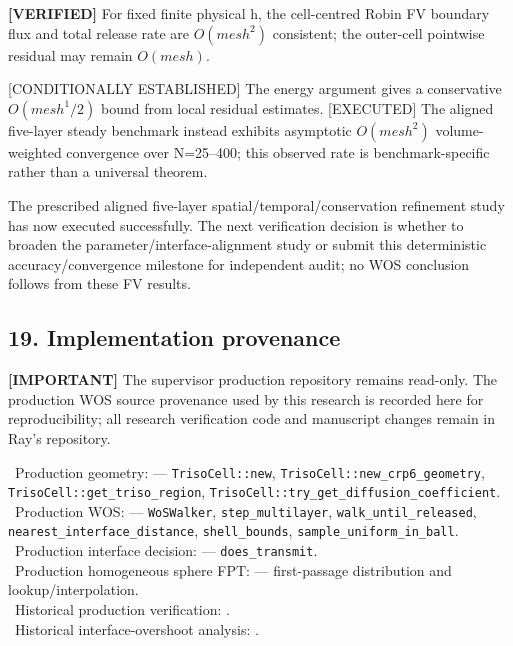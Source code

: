 \documentclass[11pt,a4paper]{article}
\begin{document}
\textbf{[VERIFIED]} For fixed finite physical h, the cell-centred Robin FV boundary flux and total release rate are $O(mesh^2)$ consistent; the outer-cell pointwise residual may remain $O(mesh)$.

[CONDITIONALLY ESTABLISHED] The energy argument gives a conservative $O(mesh^1/2)$ bound from local residual estimates. [EXECUTED] The aligned five-layer steady benchmark instead exhibits asymptotic $O(mesh^2)$ volume-weighted convergence over N=25–400; this observed rate is benchmark-specific rather than a universal theorem.

The prescribed aligned five-layer spatial/temporal/conservation refinement study has now executed successfully. The next verification decision is whether to broaden the parameter/interface-alignment study or submit this deterministic accuracy/convergence milestone for independent audit; no WOS conclusion follows from these FV results.

\subsection*{19. Implementation provenance}

\textbf{[IMPORTANT]} The supervisor production repository remains read-only. The production WOS source provenance used by this research is recorded here for reproducibility; all research verification code and manuscript changes remain in Ray's repository.

\noindent\textbullet\ Production geometry:  — \texttt{TrisoCell::new}, \texttt{TrisoCell::new\_crp6\_geometry}, \texttt{TrisoCell::get\_triso\_region}, \texttt{TrisoCell::try\_get\_diffusion\_coefficient}.\\
\noindent\textbullet\ Production WOS:  — \texttt{WoSWalker}, \texttt{step\_multilayer}, \texttt{walk\_until\_released}, \texttt{nearest\_interface\_distance}, \texttt{shell\_bounds}, \texttt{sample\_uniform\_in\_ball}.\\
\noindent\textbullet\ Production interface decision:  — \texttt{does\_transmit}.\\
\noindent\textbullet\ Production homogeneous sphere FPT:  — first-passage distribution and lookup/interpolation.\\
\noindent\textbullet\ Historical production verification: .\\
\noindent\textbullet\ Historical interface-overshoot analysis: .\\
\end{document}
